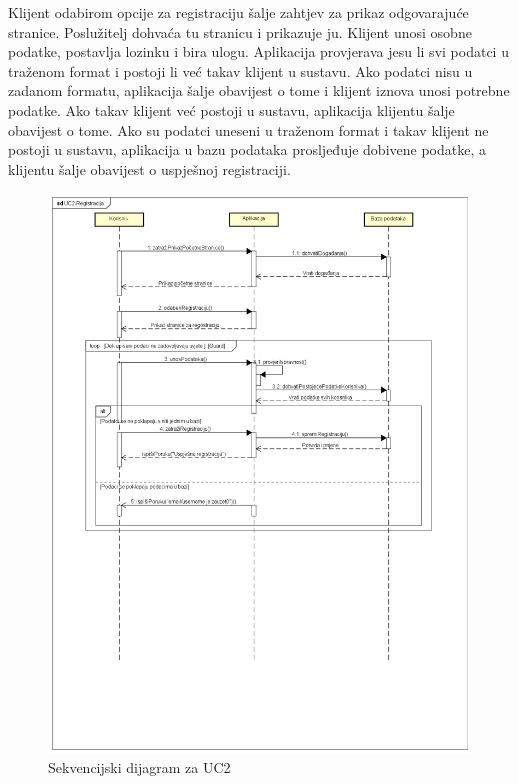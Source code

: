 				
				Klijent odabirom opcije za registraciju šalje zahtjev za prikaz odgovarajuće stranice. Poslužitelj dohvaća tu stranicu i prikazuje ju. Klijent unosi osobne podatke, postavlja lozinku i bira ulogu. Aplikacija provjerava jesu li svi podatci u traženom format i postoji li već takav klijent u sustavu. Ako podatci nisu u zadanom formatu, aplikacija šalje obavijest o tome i klijent iznova unosi potrebne podatke. Ako takav klijent već postoji u sustavu, aplikacija klijentu šalje obavijest o tome. Ako su podatci uneseni u traženom format i takav klijent ne postoji u sustavu, aplikacija u bazu podataka prosljeđuje dobivene podatke, a klijentu šalje obavijest o uspješnoj registraciji.
				\begin{figure}[H]
						\includegraphics[width=\textwidth]{slike/uc2-1.PNG}
						\caption{Sekvencijski dijagram za UC2}
						\label{fig:uc2}
				\end{figure}
				
				
				\eject
	
